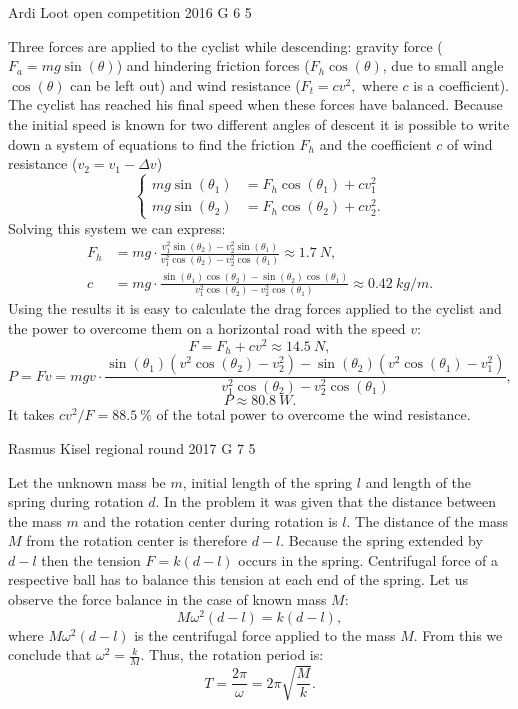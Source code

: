 \documentclass[11pt]{article}
\begin{document}
{Ardi Loot} %
{open competition} %
{2016} %
{G 6} %
{5} %
{

\ifEngSolution
Three forces are applied to the cyclist while descending: gravity force ($F_{a}=mg\sin(\theta)$) and hindering friction forces ($F_{h}\cos(\theta)$, due to small angle $\cos(\theta)$ can be left out) and wind resistance ($F_{t}=cv^{2},$ where $c$ is a coefficient). The cyclist has reached his final speed when these forces have balanced. Because the initial speed is known for two different angles of descent it is possible to write down a system of equations to find the friction $F_{h}$ and the coefficient $c$ of wind resistance ($v_{2}=v_{1}-\Delta v$)
\[
\begin{cases}
mg\sin(\theta_{1})&=F_{h}\cos(\theta_1)+cv_{1}^{2}\\
mg\sin(\theta_{2})&=F_{h}\cos(\theta_2)+cv_{2}^{2}.
\end{cases}
\] 
Solving this system we can express:
\begin{align*}
F_{h} & = mg\cdot\frac{v_{1}^{2}\sin(\theta_{2})-v_{2}^{2}\sin(\theta_{1})}{v_{1}^{2}\cos(\theta_2)-v_{2}^{2}\cos(\theta_1)}\approx\SI{1.7}{N},\\[7pt] 
c & = mg\cdot\frac{\sin(\theta_{1})\cos(\theta_2)-\sin(\theta_{2})\cos(\theta_1)}{v_{1}^{2}\cos(\theta_2)-v_{2}^{2}\cos(\theta_1)}\approx\SI{0.42}{kg/m}.
\end{align*} 
Using the results it is easy to calculate the drag forces applied to the cyclist and the power to overcome them on a horizontal road with the speed $v$:
\[
F=F_{h}+cv^{2}\approx\SI{14.5}{N},
\] 
\[
P=Fv=mgv\cdot\frac{\sin(\theta_{1})\left(v^{2}\cos(\theta_2)-v_{2}^{2}\right)-\sin(\theta_{2})\left(v^{2}\cos(\theta_1)-v_{1}^{2}\right)}{v_{1}^{2}\cos(\theta_2)-v_{2}^{2}\cos(\theta_1)},
\]
\[
P\approx\SI{80.8}{W}.
\]
It takes $cv^{2}/F=\SI{88.5}{\percent}$ of the total power to overcome the wind resistance.
\fi
}

{Rasmus Kisel} %
{regional round} %
{2017} %
{G 7} %
{5} %
{

\ifEngSolution
Let the unknown mass be $m$, initial length of the spring $l$ and length of the spring during rotation $d$. In the problem it was given that the distance between the mass $m$ and the rotation center during rotation is $l$. The distance of the mass $M$ from the rotation center is therefore $d-l$. Because the spring extended by $d-l$ then the tension $F=k(d-l)$ occurs in the spring. Centrifugal force of a respective ball has to balance this tension at each end of the spring. Let us observe the force balance in the case of known mass $M$:
\begin{equation*}
M\omega^2(d-l)=k(d-l),
\end{equation*} 
where $M\omega^2(d-l)$ is the centrifugal force applied to the mass $M$. From this we conclude that $\omega^2=\frac{k}{M}$. Thus, the rotation period is:
\begin{equation*}
T=\frac{2\pi}{\omega}=2\pi \sqrt{\frac{M}{k}}.
\end{equation*}
\fi
}
\end{document}
